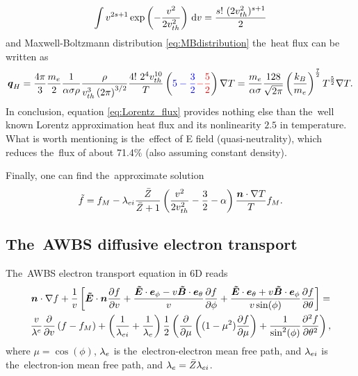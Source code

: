 \documentclass[preprint,12pt]{elsarticle}
\newcommand{\refeq}[1]{\eqref{#1}}
\newcounter{bla}
\begin{document}
\begin{equation}
  \int v^{2s+1} \exp\left(-\frac{v^2}{2v_{th}^2}\right)\, \text{d}v = 
  \frac{s!~(2 v_{th}^2)^{s+1}}{2}
  \nonumber 
\end{equation}
and Maxwell-Boltzmann distribution \refeq{eq:MBdistribution} the~heat flux can 
be written as
\begin{equation}
  \boldsymbol{q}_H = \frac{4\pi}{3}\frac{m_e}{2}\frac{1}{\alpha \sigma\rho}
  \frac{\rho}{v_{th}^3 \left( 2 \pi \right)^{3/2}}
  \frac{4!~2^4 v_{th}^{10}}{T} \left( 
  \textcolor{blue}{
  5 - \frac{3}{2}
  }
  \textcolor{red}{
  - \frac{5}{2}
  }
  \right) \nabla T 
  = \frac{m_e}{\alpha \sigma}\frac{128}{\sqrt{2 \pi}}
  \left(\frac{k_B}{m_e}\right)^{\frac{7}{2}}T^{\frac{5}{2}} \nabla T .
  \label{eq:Lorentz_flux}
\end{equation} 
In conclusion, equation \refeq{eq:Lorentz_flux} provides nothing else than
the~well known Lorentz approximation heat flux and its nonlinearity $2.5$
in temperature. What is worth mentioning is the~effect of E field 
(quasi-neutrality), which reduces the~flux of about	71.4$\%$ 
(also assuming constant density).


Finally, one can find the~approximate solution
\begin{equation}
  \tilde{f} = f_M - \lambda_{ei}\frac{\bar{Z}}{\bar{Z}+1}
  \left( \frac{v^2}{2 v_{th}^2} - \frac{3}{2} - \alpha\right)
  \frac{\boldsymbol{n}\cdot\nabla T}{T}f_M .
  \label{eq:BGK_approximate_solution}
\end{equation}


\subsection{The~AWBS diffusive electron transport}
\label{sec:AWBSDiffusiveRegime}

The~AWBS electron transport equation in 6D reads
\begin{multline}
  \boldsymbol{n}\cdot\nabla f + \frac{1}{v} \left[ \boldsymbol{\tilde{E}}\cdot\boldsymbol{n} \frac{\partial{f}}{\partial{v}} 
  + \frac{\boldsymbol{\tilde{E}}\cdot\boldsymbol{e}_\phi 
  - v\boldsymbol{\tilde{B}}\cdot\boldsymbol{e}_\theta}{v}\frac{\partial{f}}{\partial{\phi}}
  + \frac{\boldsymbol{\tilde{E}}\cdot\boldsymbol{e}_\theta + v\boldsymbol{\tilde{B}}\cdot\boldsymbol{e}_\phi}
  {v\sin(\phi)}\frac{\partial{f}}{\partial{\theta}} \right] 
  =\\
  \frac{v}{\lambda^e}\frac{\partial{}}{\partial{v}}\left(f - f_M\right) 
  + \left(\frac{1}{\lambda_{ei}} + \frac{1}{\lambda_e} \right) \frac{1}{2}
  \left(\frac{\partial{}}{\partial{\mu}}\left((1 - \mu^2)\frac{\partial{f}}{\partial{\mu}}\right)
  + \frac{1}{\sin^2(\phi)}\frac{\partial^2f}{\partial\theta^2} \right) ,
  \label{eq:AWBS_spherical}
\end{multline}
where $\mu = \cos(\phi)$, $\lambda_e$ is the~electron-electron mean free path, and
$\lambda_{ei}$ is the~electron-ion mean free path, and $\lambda_e = \bar{Z} \lambda_{ei}$.
\end{document}
